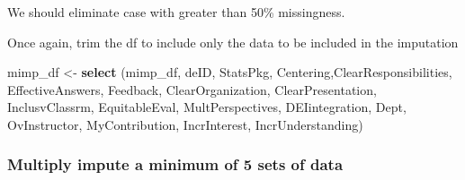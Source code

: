 \documentclass[
  11pt,
]{book}
\newenvironment{Shaded}{\begin{snugshade}}{\end{snugshade}}
\newcommand{\AttributeTok}[1]{\textcolor[rgb]{0.27,0.27,0.27}{#1}}
\newcommand{\CommentTok}[1]{\textcolor[rgb]{0.37,0.37,0.37}{\textit{#1}}}
\newcommand{\DecValTok}[1]{\textcolor[rgb]{0.06,0.06,0.06}{#1}}
\newcommand{\FunctionTok}[1]{\textcolor[rgb]{0.27,0.27,0.27}{\textbf{#1}}}
\newcommand{\NormalTok}[1]{#1}
\newcommand{\OtherTok}[1]{\textcolor[rgb]{0.37,0.37,0.37}{#1}}
\newcommand{\SpecialCharTok}[1]{\textcolor[rgb]{0.43,0.43,0.43}{\textbf{#1}}}
\begin{document}
We should eliminate case with greater than 50\% missingness.

\begin{Shaded}
\end{Shaded}

Once again, trim the df to include only the data to be included in the imputation

\begin{Shaded}
\begin{Highlighting}[]
\NormalTok{mimp\_df }\OtherTok{\textless{}{-}}  \FunctionTok{select}\NormalTok{ (mimp\_df, deID, StatsPkg, Centering,ClearResponsibilities, EffectiveAnswers, Feedback, ClearOrganization, ClearPresentation, InclusvClassrm, EquitableEval, MultPerspectives, DEIintegration, Dept, OvInstructor, MyContribution, IncrInterest, IncrUnderstanding)}
\end{Highlighting}
\end{Shaded}

\hypertarget{multiply-impute-a-minimum-of-5-sets-of-data}{%
\subsubsection{Multiply impute a minimum of 5 sets of data}\label{multiply-impute-a-minimum-of-5-sets-of-data}}
\end{document}
